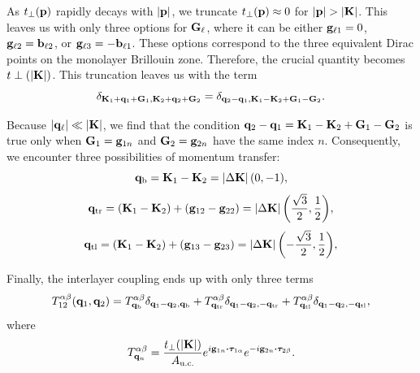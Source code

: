 \documentclass[12pt]{report}
\begin{document}
As $t_\perp({\vb{p}})$ rapidly decays with $\abs{{\vb{p}}}$, we truncate $t_\perp({\vb{p}}) \approx 0$ for $\abs{{\vb{p}}} > \abs{\vb{K}}$. This leaves us with only three options for ${\vb{G}}_\ell$, where it can be either ${\vb{g}}_{\ell 1} = 0$, ${\vb{g}}_{\ell 2} = \vb{b}_{\ell 2}$, or ${\vb{g}}_{\ell 3} = -\vb{b}_{\ell 1}$. These options correspond to the three equivalent Dirac points on the monolayer Brillouin zone. Therefore, the crucial quantity becomes $t\perp(\abs{\vb{K}})$. This truncation leaves us with the term
\begin{equation} \label{eq:delta-term}
\delta_{\vb{K}_1+{\vb{q}}_1+{\vb{G}}_1,\vb{K}_2+{\vb{q}}_2+{\vb{G}}_2} = \delta_{{\vb{q}}_2-{\vb{q}}_1,\vb{K}_1-\vb{K}_2+{\vb{G}}_1-{\vb{G}}_2}.
\end{equation}

Because $\abs{{\vb{q}}_\ell} \ll \abs{\vb{K}}$, we find that the condition ${\vb{q}}_2-{\vb{q}}_1 = \vb{K}_1-\vb{K}_2+{\vb{G}}_1-{\vb{G}}_2$ is true only when ${\vb{G}}_1 = {\vb{g}}_{1n}$ and ${\vb{G}}_2 = {\vb{g}}_{2n}$ have the same index $n$. Consequently, we encounter three possibilities of momentum transfer:
\begin{equation} \label{eq:qb}
{\vb{q}}_\text{b} = \vb{K}_1 - \vb{K}_2 = \abs{\Delta \vb{K}} \, \qty(0, -1),
\end{equation}
\begin{equation} \label{eq:qtr}
{\vb{q}}_\text{tr} = (\vb{K}_1 - \vb{K}_2) + ({\vb{g}}_{12} - {\vb{g}}_{22}) = \abs{\Delta \vb{K}} \, \qty(\frac{\sqrt{3}}{2}, \frac{1}{2}),
\end{equation}
\begin{equation} \label{eq:qtl}
{\vb{q}}_\text{tl} = (\vb{K}_1 - \vb{K}_2) + ({\vb{g}}_{13} - {\vb{g}}_{23}) = \abs{\Delta \vb{K}} \, \qty(-\frac{\sqrt{3}}{2}, \frac{1}{2}),
\end{equation}

Finally, the interlayer coupling ends up with only three terms
\begin{equation} \label{eq:interlayer-3terms}
T_{12}^{\alpha\beta}({\vb{q}}_1,{\vb{q}}_2) =
T^{\alpha\beta}_{{\vb{q}}_\text{b}} \delta_{{\vb{q}}_1-{\vb{q}}_2, {\vb{q}}_\text{b}} +
T^{\alpha\beta}_{{\vb{q}}_\text{tr}} \delta_{{\vb{q}}_1-{\vb{q}}_2, -{\vb{q}}_\text{tr}} +
T^{\alpha\beta}_{{\vb{q}}_\text{tl}} \delta_{{\vb{q}}_1-{\vb{q}}_2, -{\vb{q}}_\text{tl}},
\end{equation}
where
\begin{equation} \label{eq:interlayer-tensor}
T^{\alpha\beta}_{\q_n} = \frac{t_\perp(\abs{\K})}{A_{\text{u.c.}}} e^{i \g_{1n} \vdot \bm{\tau}_{1\alpha}}
e^{-i \g_{2n} \vdot \bm{\tau}_{2\beta}}.
\end{equation}
\end{document}
